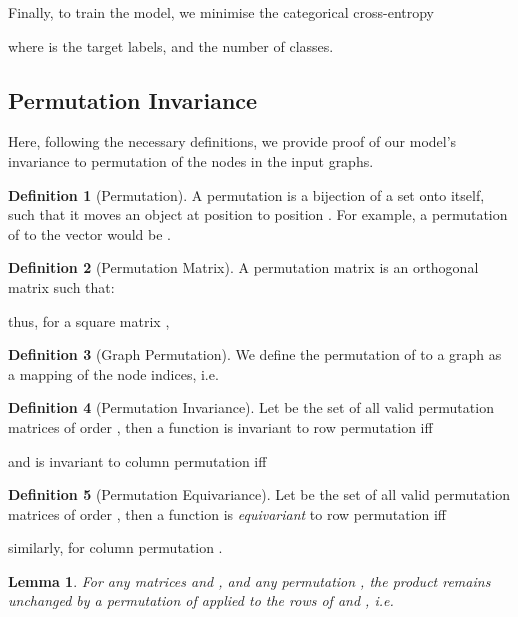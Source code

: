 \documentclass{article}
\newtheorem{lemma}[theorem]{Lemma}
\theoremstyle{definition}
\newtheorem{definition}{Definition}[section]
\begin{document}
Finally, to train the model, we minimise the categorical cross-entropy
\small

\normalsize
where  is the target labels, and  the number of classes.

\subsection{Permutation Invariance}

Here, following the necessary definitions, we provide proof of our model's invariance to permutation of the nodes in the input graphs.

\begin{definition}[Permutation]
  A permutation  is a bijection of a set  onto itself, such that it moves an object at position  to position . For example, a permutation of  to the vector  would be .
\end{definition}

\begin{definition}[Permutation Matrix]
  A permutation matrix  is an orthogonal matrix such that:
  
  thus, for a square matrix ,
  
\end{definition}

\begin{definition}[Graph Permutation]
  We define the permutation of  to a graph  as a mapping of the node indices, i.e.
  
  \label{def:graphperm}
\end{definition}

\begin{definition}[Permutation Invariance]
  Let  be the set of all valid permutation matrices of order , then a function  is invariant to row permutation iff
  
  and  is invariant to column permutation iff
  
\end{definition}

\begin{definition}[Permutation Equivariance]
  Let  be the set of all valid permutation matrices of order , then a function  is \emph{equivariant} to row permutation iff
  
  similarly, for column permutation .
\end{definition}

\begin{lemma}
  \label{lma:dot}
  For any matrices  and , and any permutation , the product  remains unchanged by a permutation of  applied to the rows of  and , i.e.
  
\end{lemma}
\end{document}
